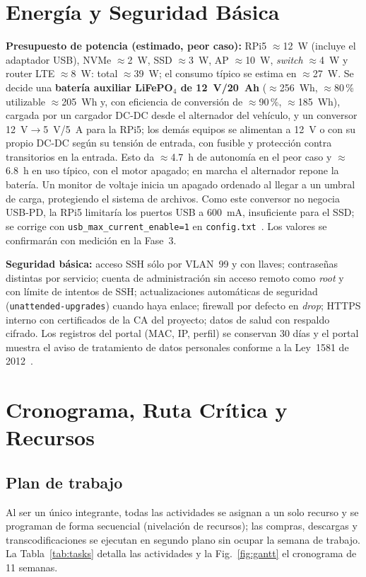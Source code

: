 \documentclass[conference]{IEEEtran}
\begin{document}
\section{Energía y Seguridad Básica}\label{sec:power}
\textbf{Presupuesto de potencia (estimado, peor caso):} RPi5 $\approx$12~W (incluye el adaptador USB), NVMe $\approx$2~W, SSD $\approx$3~W, AP $\approx$10~W, \textit{switch} $\approx$4~W y router LTE $\approx$8~W: total $\approx$39~W; el consumo típico se estima en $\approx$27~W. Se decide una \textbf{batería auxiliar LiFePO$_4$ de 12~V/20~Ah} ($\approx$256~Wh, $\approx$80\,\% utilizable $\approx$205~Wh y, con eficiencia de conversión de $\approx$90\,\%, $\approx$185~Wh), cargada por un cargador DC-DC desde el alternador del vehículo, y un conversor 12~V$\to$5~V/5~A para la RPi5; los demás equipos se alimentan a 12~V o con su propio DC-DC según su tensión de entrada, con fusible y protección contra transitorios en la entrada. Esto da $\approx$4.7~h de autonomía en el peor caso y $\approx$6.8~h en uso típico, con el motor apagado; en marcha el alternador repone la batería. Un monitor de voltaje inicia un apagado ordenado al llegar a un umbral de carga, protegiendo el sistema de archivos. Como este conversor no negocia USB-PD, la RPi5 limitaría los puertos USB a 600~mA, insuficiente para el SSD; se corrige con \texttt{usb\_max\_current\_enable=1} en \texttt{config.txt}~\cite{rpipower}. Los valores se confirmarán con medición en la Fase~3.

\textbf{Seguridad básica:} acceso SSH sólo por VLAN~99 y con llaves; contraseñas distintas por servicio; cuenta de administración sin acceso remoto como \textit{root} y con límite de intentos de SSH; actualizaciones automáticas de seguridad (\texttt{unattended-upgrades}) cuando haya enlace; firewall por defecto en \textit{drop}; HTTPS interno con certificados de la CA del proyecto; datos de salud con respaldo cifrado. Los registros del portal (MAC, IP, perfil) se conservan 30 días y el portal muestra el aviso de tratamiento de datos personales conforme a la Ley~1581 de 2012~\cite{ley1581}.

\section{Cronograma, Ruta Crítica y Recursos}

\subsection{Plan de trabajo}
Al ser un único integrante, todas las actividades se asignan a un solo recurso y se programan de forma secuencial (nivelación de recursos); las compras, descargas y transcodificaciones se ejecutan en segundo plano sin ocupar la semana de trabajo. La Tabla~\ref{tab:tasks} detalla las actividades y la Fig.~\ref{fig:gantt} el cronograma de 11 semanas.
\end{document}
